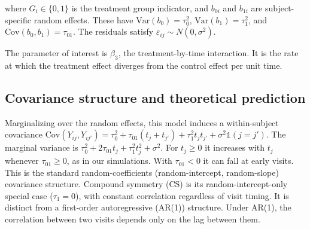 \documentclass[
  11pt,
]{article}
\begin{document}
where \(G_i \in \{0, 1\}\) is the treatment group indicator, and
\(b_{0i}\) and \(b_{1i}\) are subject-specific random effects. These
have \(\text{Var}(b_0) = \tau_0^2\), \(\text{Var}(b_1) = \tau_1^2\),
and \(\text{Cov}(b_0, b_1) = \tau_{01}\). The residuals satisfy
\(\varepsilon_{ij} \sim N(0, \sigma^2)\).

The parameter of interest is \(\beta_3\), the treatment-by-time
interaction. It is the rate at which the treatment effect
diverges from the control effect per unit time.

\subsection{Covariance structure and theoretical prediction}\label{covariance-structure-and-theoretical-prediction}

Marginalizing over the random effects, this model induces a
within-subject covariance
\(\text{Cov}(Y_{ij}, Y_{ij'}) = \tau_0^2 + \tau_{01}(t_j + t_{j'}) +
\tau_1^2 t_j t_{j'} + \sigma^2 \mathbb{1}(j = j')\). The marginal
variance is \(\tau_0^2 + 2\tau_{01} t_j + \tau_1^2 t_j^2 +
\sigma^2\). For \(t_j \geq 0\) it increases with \(t_j\) whenever
\(\tau_{01} \geq 0\), as in our simulations. With \(\tau_{01} < 0\) it
can fall at early visits. This is the standard
random-coefficients (random-intercept, random-slope) covariance
structure. Compound symmetry (CS) is its random-intercept-only
special case (\(\tau_1 = 0\)), with constant correlation regardless
of visit timing. It is distinct from a first-order autoregressive
(AR(1)) structure. Under AR(1), the correlation between two visits
depends only on the lag between them.
\end{document}
